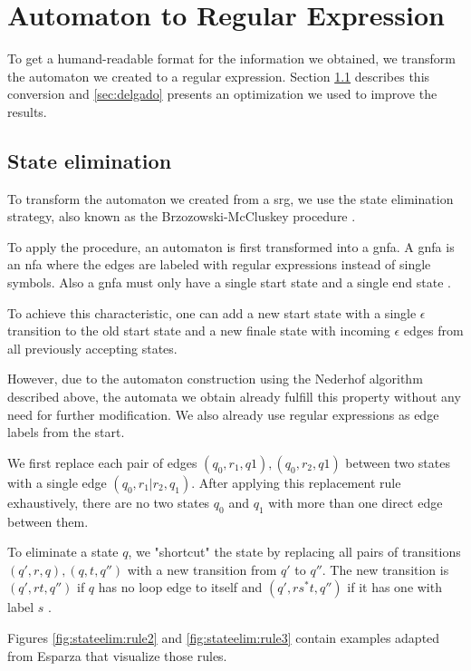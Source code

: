\section{Automaton to Regular Expression}\label{sec:nfa2regex}

To get a humand-readable format for the information we obtained, we transform the automaton we created to a regular expression. Section \ref{sec:stateElimination} describes this conversion and \ref{sec:delgado} presents an optimization we used to improve the results.

\subsection{State elimination}\label{sec:stateElimination}

To transform the automaton we created from a \ac{srg}, we use the state elimination strategy, also known as the Brzozowski-McCluskey procedure \cite{brzozowksi_mccluskey}.

To apply the procedure, an automaton is first transformed into a \ac{gnfa}. A \ac{gnfa} is an \ac{nfa} where the edges are labeled with regular expressions instead of single symbols.
Also a \ac{gnfa} must only have a single start state and a single end state \cite{hanGNFA}.

To achieve this characteristic, one can add a new start state with a single $\epsilon$ transition to the old start state and a new finale state with incoming $\epsilon$ edges from all previously accepting states.

However, due to the automaton construction using the Nederhof algorithm described above, the automata we obtain already fulfill this property without any need for further modification.
We also already use regular expressions as edge labels from the start.

We first replace each pair of edges $(q_0, r_1, q1), (q_0, r_2, q1)$ between two states with a single edge $(q_0, r_1|r_2, q_1)$.
After applying this replacement rule exhaustively, there are no two states $q_0$ and $q_1$ with more than one direct edge between them.

To eliminate a state $q$, we "shortcut" the state by replacing all pairs of transitions $(q',r, q), (q, t, q'')$ with a new transition from $q'$ to $q''$.
The new transition is $(q', rt, q'')$ if $q$ has no loop edge to itself and $(q', rs^*t, q'')$ if it has one with label $s$ \cite{esparza}.

Figures \ref{fig:stateelim:rule2} and \ref{fig:stateelim:rule3} contain examples adapted from Esparza \cite{esparza} that visualize those rules.

